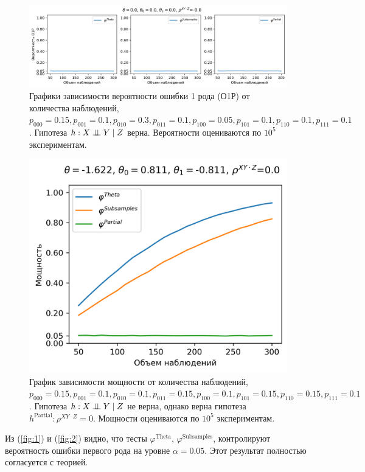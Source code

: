 \begin{figure}[H]
    \centering
    \includegraphics[scale=0.55]{images/graph2.png}
    \caption{Графики зависимости вероятности ошибки 1 рода (О1Р) от количества наблюдений,
    $p_{000}=0.15, p_{001}=0.1, p_{010}=0.3, p_{011}=0.1,
    p_{100}=0.05, p_{101}=0.1, p_{110}=0.1, p_{111}=0.1$. 
    Гипотеза $h: X \perp\!\!\!\perp Y \mid Z$ верна.
    Вероятности оцениваются по $10^5$ экспериментам.} \label{fig:2}
\end{figure}

\begin{figure}[H]
    \centering
    \includegraphics[scale=0.55]{images/graph4.png}
    \caption{График зависимости мощности от количества наблюдений,
    $p_{000}=0.15, p_{001}=0.1, 
    p_{010}=0.1, p_{011}=0.15,
    p_{100}=0.1, p_{101}=0.15, p_{110}=0.15, p_{111}=0.1$. 
    Гипотеза $h: X \perp\!\!\!\perp Y \mid Z$ не верна, 
    однако верна гипотеза 
    $h^{\text{Partial}}: \rho^{XY\cdot Z}=0$.
    Мощности оцениваются по $10^5$ экспериментам.} \label{fig:4}
\end{figure}

Из (\autoref{fig:1}) и (\autoref{fig:2}) видно, что тесты 
$\varphi^{\text{Theta}}$, $\varphi^{\text{Subsamples}}$, контролируют вероятность 
ошибки первого рода на уровне $\alpha=0.05$. Этот результат
полностью согласуется с теорией.

